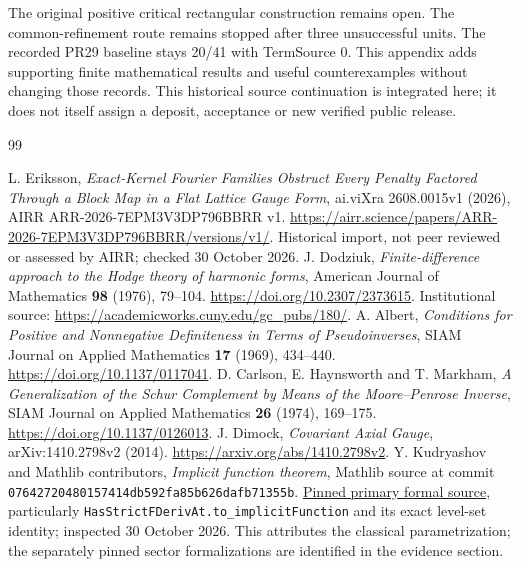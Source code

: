 \documentclass[11pt]{article}
\begin{document}
The original positive critical rectangular construction remains open.
The common-refinement route remains stopped after three unsuccessful units.
The recorded PR29 baseline stays 20/41 with TermSource 0. This appendix adds
supporting finite mathematical results and useful counterexamples without
changing those records. This historical source continuation is integrated here; it does not itself assign a deposit,
acceptance or new verified public release.








\begin{thebibliography}{99}
\small
\raggedright
{} L. Eriksson, \emph{Exact-Kernel Fourier Families Obstruct
Every Penalty Factored Through a Block Map in a Flat Lattice Gauge Form},
ai.viXra 2608.0015v1 (2026), AIRR ARR-2026-7EPM3V3DP796BBRR v1.
\url{https://airr.science/papers/ARR-2026-7EPM3V3DP796BBRR/versions/v1/}.
Historical import, not peer reviewed or assessed by AIRR; checked 30 October 2026.
 J. Dodziuk, \emph{Finite-difference approach to the Hodge
theory of harmonic forms}, American Journal of Mathematics \textbf{98}
(1976), 79--104. \url{https://doi.org/10.2307/2373615}.
Institutional source: \url{https://academicworks.cuny.edu/gc_pubs/180/}.
 A. Albert, \emph{Conditions for Positive and Nonnegative
Definiteness in Terms of Pseudoinverses}, SIAM Journal on Applied Mathematics
\textbf{17} (1969), 434--440. \url{https://doi.org/10.1137/0117041}.
 D. Carlson, E. Haynsworth and T. Markham,
\emph{A Generalization of the Schur Complement by Means of the Moore--Penrose
Inverse}, SIAM Journal on Applied Mathematics \textbf{26} (1974), 169--175.
\url{https://doi.org/10.1137/0126013}.
 J. Dimock, \emph{Covariant Axial Gauge},
arXiv:1410.2798v2 (2014). \url{https://arxiv.org/abs/1410.2798v2}.
 Y. Kudryashov and Mathlib contributors,
\emph{Implicit function theorem}, Mathlib source at commit
\texttt{07642720480157414db592fa85b626dafb71355b}.
\href{https://github.com/leanprover-community/mathlib4/blob/07642720480157414db592fa85b626dafb71355b/Mathlib/Analysis/Calculus/Implicit.lean}{Pinned primary formal source},
particularly \texttt{HasStrictFDerivAt.to\_implicitFunction} and its exact
level-set identity; inspected 30 October 2026. This attributes the classical parametrization; the separately pinned sector formalizations are identified in the evidence section.

\end{thebibliography}
\end{document}
